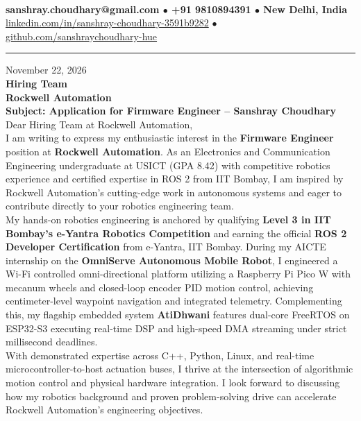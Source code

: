 \documentclass[10pt,a4paper]{article}%
\begin{document}
%
 \vspace{3pt}\\%
\noindent \textbf{\footnotesize sanshray.choudhary@gmail.com $\bullet$ +91 9810894391 $\bullet$ New Delhi, India}\\%
\noindent \href{https://www.linkedin.com/in/sanshray-choudhary-3591b9282}{linkedin.com/in/sanshray-choudhary-3591b9282} $\bullet$ \href{https://github.com/sanshraychoudhary-hue}{github.com/sanshraychoudhary-hue} \vspace{12pt}%
\hrule \vspace{18pt}%

\noindent November 22, 2026 \vspace{12pt}\\%
\noindent \textbf{Hiring Team} \\%
\noindent \textbf{Rockwell Automation} \vspace{16pt}\\%

\noindent \textbf{Subject: Application for Firmware Engineer -- Sanshray Choudhary} \vspace{12pt}\\%

\noindent Dear Hiring Team at Rockwell Automation, \vspace{8pt}\\%

\noindent I am writing to express my enthusiastic interest in the \textbf{Firmware Engineer} position at \textbf{Rockwell Automation}. As an Electronics and Communication Engineering undergraduate at USICT (GPA 8.42) with competitive robotics experience and certified expertise in ROS 2 from IIT Bombay, I am inspired by Rockwell Automation's cutting-edge work in autonomous systems and eager to contribute directly to your robotics engineering team. \vspace{8pt}\\\noindent My hands-on robotics engineering is anchored by qualifying \textbf{Level 3 in IIT Bombay's e-Yantra Robotics Competition} and earning the official \textbf{ROS 2 Developer Certification} from e-Yantra, IIT Bombay. During my AICTE internship on the \textbf{OmniServe Autonomous Mobile Robot}, I engineered a Wi-Fi controlled omni-directional platform utilizing a Raspberry Pi Pico W with mecanum wheels and closed-loop encoder PID motion control, achieving centimeter-level waypoint navigation and integrated telemetry. Complementing this, my flagship embedded system \textbf{AtiDhwani} features dual-core FreeRTOS on ESP32-S3 executing real-time DSP and high-speed DMA streaming under strict millisecond deadlines. \vspace{8pt}\\\noindent With demonstrated expertise across C++, Python, Linux, and real-time microcontroller-to-host actuation buses, I thrive at the intersection of algorithmic motion control and physical hardware integration. I look forward to discussing how my robotics background and proven problem-solving drive can accelerate Rockwell Automation's engineering objectives. \vspace{8pt}\\
\end{document}
